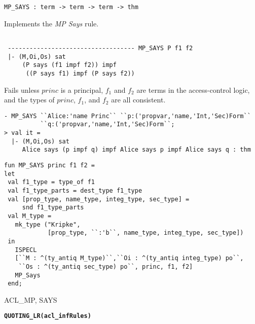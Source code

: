 \begin{verbatim}
MP_SAYS : term -> term -> term -> thm
\end{verbatim}

\SYNOPSIS
Implements the \emph{MP Says} rule.

\DESCRIBE

\begin{verbatim}

 ----------------------------------- MP_SAYS P f1 f2
 |- (M,Oi,Os) sat 
     (P says (f1 impf f2)) impf 
      ((P says f1) impf (P says f2))
\end{verbatim}

\FAILURE 
Fails unless $princ$ is a principal, $f_1$ and $f_2$ are
terms in the access-control logic, and the types of $princ$, $f_1$,
and $f_2$ are all consistent.

\EXAMPLE
\begin{holboxed}
\begin{verbatim}
- MP_SAYS ``Alice:'name Princ`` ``p:('propvar,'name,'Int,'Sec)Form`` 
          ``q:('propvar,'name,'Int,'Sec)Form``;
> val it =
  |- (M,Oi,Os) sat
     Alice says (p impf q) impf Alice says p impf Alice says q : thm
\end{verbatim}
\end{holboxed}

\IMPLEMENTATION
\begin{holboxed}
\begin{verbatim}
fun MP_SAYS princ f1 f2 = 
let
 val f1_type = type_of f1
 val f1_type_parts = dest_type f1_type
 val [prop_type, name_type, integ_type, sec_type] = 
     snd f1_type_parts
 val M_type = 
   mk_type ("Kripke",
            [prop_type, ``:'b``, name_type, integ_type, sec_type])
 in
   ISPECL
   [``M : ^(ty_antiq M_type)``,``Oi : ^(ty_antiq integ_type) po``,
    ``Os : ^(ty_antiq sec_type) po``, princ, f1, f2]
   MP_Says
 end;
\end{verbatim}
\end{holboxed}

\SEEALSO
ACL\_MP, SAYS
\ENDDOC

\begin{holboxed}
  \begin{Large}
    \textbf{\texttt{QUOTING\_LR}}\hfill{}\textbf{\texttt{(acl\_infRules)}}
  \end{Large}
\end{holboxed}

